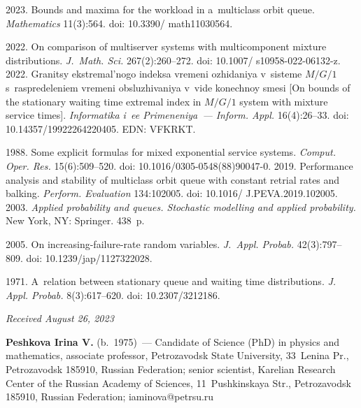 \begin{multicols}{2}
{{\begin{thebibliography}{99}
 2023. Bounds and maxima for the workload in a~multiclass orbit queue. \textit{Mathematics} 11(3):564. doi: 10.3390/ math11030564.

 2022. On comparison of multiserver systems with multicomponent mixture distributions. 
\textit{J.~Math. Sci.} 267(2):260--272. doi: 10.1007/ s10958-022-06132-z.
 2022. Granitsy ekstremal'nogo in\-dek\-sa vre\-me\-ni ozhi\-da\-niya v~sis\-te\-me $M/G/1$ 
s~raspredeleniem vremeni obsluzhivaniya v~vide konechnoy
smesi [On bounds of the stationary waiting time extremal index in $M/G/1$
system with mixture service times]. \textit{Informatika i~ee Primeneniya~--- Inform. Appl.} 16(4):26--33. doi: 10.14357/19922264220405. EDN: VFKRKT.

 1988. 
Some explicit formulas for mixed exponential service systems. 
\textit{Comput. Oper. Res.} 15(6):509--520. doi: 10.1016/0305-0548(88)90047-0.
 2019.
Performance analysis and stability of multiclass orbit queue with constant retrial rates and balking.
\textit{Perform. Evaluation} 134:102005. doi: 10.1016/ J.PEVA.2019.102005.
 2003. \textit{Applied probability and queues. Stochastic modelling and 
applied probability.} New York, NY: Springer. 438~p.

 2005. On increasing-failure-rate random variables. \textit{J.~Appl. Probab.} 42(3):797--809. doi: 10.1239/jap/1127322028.
 
 1971. A~relation between stationary queue and waiting time distributions. \textit{J. Appl. Probab.} 8(3):617--620.
doi: 10.2307/3212186.

\end{thebibliography}

 }
 }

\end{multicols}

\vspace*{-6pt}

\hfill{\small\textit{Received August 26, 2023}} 


\Contrl

\vspace*{-4pt}

\noindent
\textbf{Peshkova Irina V.} (b.\ 1975)~--- 
Candidate of Science (PhD) in physics and mathematics, associate professor, Petrozavodsk State University, 33~Lenina Pr., Petrozavodsk 185910, 
Russian Federation; senior scientist, Karelian Research Center of the Russian Academy of Sciences, 
11~Pushkinskaya Str., Petrozavodsk 185910, Russian Federation; \mbox{iaminova@petrsu.ru}


\label{end\stat}

\renewcommand{\bibname}{\protect\rm Литература} 